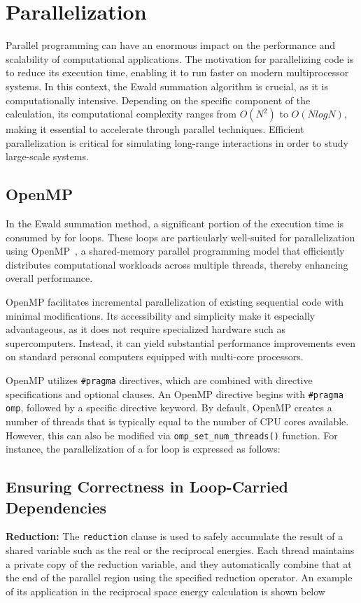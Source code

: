 \section{Parallelization}
Parallel programming can have an enormous impact on the performance and scalability of computational applications. The motivation for parallelizing code is to reduce its execution time, enabling it to run faster on modern multiprocessor systems. In this context, the Ewald summation algorithm is crucial, as it is computationally intensive. Depending on the specific component of the calculation, its computational complexity ranges from $O(N^2)$ to $O(NlogN)$, making it essential to accelerate through parallel techniques. Efficient parallelization is critical for simulating long-range interactions in order to study large-scale systems.

\subsection{OpenMP}
In the Ewald summation method, a significant portion of the execution time is consumed by for loops. These loops are particularly well-suited for parallelization using OpenMP~\cite{dagum1998openmp}, a shared-memory parallel programming model that efficiently distributes computational workloads across multiple threads, thereby enhancing overall performance.


OpenMP facilitates incremental parallelization of existing sequential code with minimal modifications. Its accessibility and simplicity make it especially advantageous, as it does not require specialized hardware such as supercomputers. Instead, it can yield substantial performance improvements even on standard personal computers equipped with multi-core processors.

OpenMP utilizes \verb|#pragma|  directives, which are combined with directive specifications and optional clauses. An OpenMP directive begins with \verb|#pragma omp|, followed by a specific directive keyword. 
By default, OpenMP creates a number of threads that is typically equal to the number of CPU cores available. However, this can also be modified via \verb|omp_set_num_threads()| function. For instance, the parallelization of a for loop is expressed as follows:



\subsection{Ensuring Correctness in Loop-Carried Dependencies}
\textbf{Reduction:} The \verb|reduction| clause is used to safely accumulate the result of a shared variable such as the real or the reciprocal energies. Each thread maintains a private copy of the reduction variable, and they automatically combine that at the end of the parallel region using the specified reduction operator. An example of its application in the reciprocal space energy calculation is shown below


